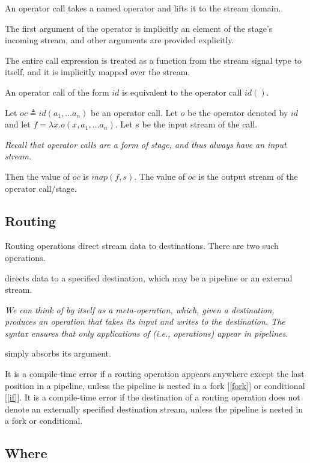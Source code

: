 \documentclass{article}
\begin{document}
An operator call takes a named operator and lifts it to the stream domain. 

\OperatorCall{}

The first argument of the operator is implicitly an element of the stage's incoming stream, and other arguments are provided explicitly.

{The entire call expression is treated as a function from the stream signal type to itself, and it is implicitly mapped over the stream.}

An operator call of the form  $id$ is equivalent to the operator call $id()$.

Let $oc \triangleq id (a_1, \ldots a_n)$ be an operator call. Let $o$ be the operator denoted by $id$ and let $f = \lambda x. o(x, a_1, \ldots a_n)$. Let $s$ be the input stream of the call. 

{\em Recall that operator calls are a form of stage, and thus always have an input stream.}

Then the value of $oc$ is $map(f, s)$. The value of $oc$ is the output stream of the operator call/stage.

\subsection{Routing}
\label{routing}

Routing operations direct stream data to destinations. There are two such operations. 

\ROUTETO{} directs data to a specified destination, which may be a pipeline or an external stream.

{\em We can think of \ROUTETO by itself as a meta-operation, which, given a destination, produces an operation that takes its input and writes to the destination. The syntax ensures that only applications of \ROUTETO (i.e., operations) appear in pipelines.}

\DROP{} simply absorbs its argument.  

\Terminal{}

It is a compile-time error if a routing operation appears anywhere except the last position in a pipeline, unless the pipeline is nested in a fork [\ref{fork}] or conditional [\ref{if}].
It is a compile-time error if the destination of a routing operation does not denote an externally specified destination stream, unless the pipeline is nested in a fork or conditional. 


\subsection{Where}
\label{where}
\end{document}
